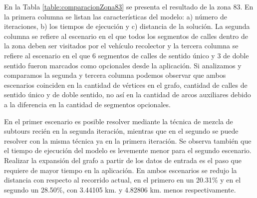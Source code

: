 En la Tabla \ref{table:comparacionZona83} se presenta el resultado de la zona 83. En la primera columna se listan las características del modelo: a) número de iteraciones, b) los tiempos de ejecución y c) distancia de la solución. La segunda columna se refiere al escenario en el que todos los segmentos de calles dentro de la zona deben ser visitados por el vehículo recolector y la tercera columna se refiere al escenario en el que 6 segmentos de calles de sentido único y 3 de doble sentido fueron marcados como opcionales desde la aplicación. Si analizamos y comparamos la segunda y tercera columna podemos observar que ambos escenarios coinciden en la cantidad de vértices en el grafo, cantidad de calles de sentido único y de doble sentido, no así en la cantidad de arcos auxiliares debido a la diferencia en la cantidad de segmentos opcionales.

En el primer escenario es posible resolver mediante la técnica de mezcla de subtours recién en la segunda iteración, mientras que en el segundo se puede resolver con la misma técnica ya en la primera iteración. Se observa también que el tiempo de ejecución del modelo es levemente menor para el segundo escenario. Realizar la expansión del grafo a partir de los datos de entrada es el paso que requiere de mayor tiempo en la aplicación. En ambos escenarios se redujo la distancia con respecto al recorrido actual, en el primero en un 20.31\%  y en el segundo un 28.50\%, con 3.44105 km. y 4.82806 km. menos respectivamente.

